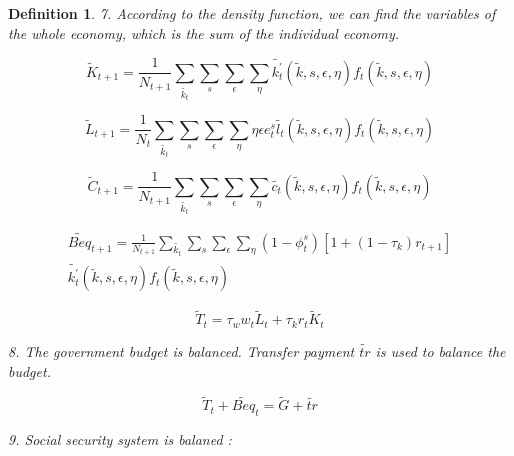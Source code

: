 \documentclass{article}
\newtheorem{definition}{Definition}[section]
\begin{document}
\begin{definition}
        7. According to the density function, we can find the variables of the whole economy, which is the sum of the individual economy.
        
            \begin{equation}
                \tilde{K}_{t+1}=\frac{1}{N_{t+1}}\sum_{\tilde{k_t}}\sum_{s}\sum_{\epsilon}\sum_{\eta}
                \tilde{k^{'}_t}(\tilde{k},s,\epsilon,\eta)f_t(\tilde{k},s,\epsilon,\eta)
            \end{equation}

            \begin{equation}
                \tilde{L}_{t+1}=\frac{1}{N_{t}}\sum_{\tilde{k_t}}\sum_{s}\sum_{\epsilon}\sum_{\eta}
                \eta\epsilon e^s_t\tilde{l_t}(\tilde{k},s,\epsilon,\eta)f_t(\tilde{k},s,\epsilon,\eta)
            \end{equation}

            \begin{equation}
                \tilde{C}_{t+1}=\frac{1}{N_{t+1}}\sum_{\tilde{k_t}}\sum_{s}\sum_{\epsilon}\sum_{\eta}
                \tilde{c_t}(\tilde{k},s,\epsilon,\eta)f_t(\tilde{k},s,\epsilon,\eta)
            \end{equation}

            \begin{equation}
                \begin{aligned}
                    \tilde{Beq}_{t+1}=\frac{1}{N_{t+1}}\sum_{\tilde{k_t}}\sum_{s}\sum_{\epsilon}\sum_{\eta}(1-\phi_t^s)[1+(1-\tau_k)r_{t+1}] \\
                \tilde{k^{'}_t}(\tilde{k},s,\epsilon,\eta)f_t(\tilde{k},s,\epsilon,\eta)
                \end{aligned}
            \end{equation}

            \begin{equation}
                \tilde{T}_t=\tau_ww_t\tilde{L}_t+\tau_kr_t\tilde{K}_t
            \end{equation}
        
        8. The government budget is balanced. Transfer payment $\tilde{tr}$ is used to balance the budget.

            \begin{equation}
               \tilde{T}_t+\tilde{Beq}_t=\tilde{G}+\tilde{tr}    
            \end{equation}
        
        9. Social security system is balaned :
        

\end{definition}
\end{document}
